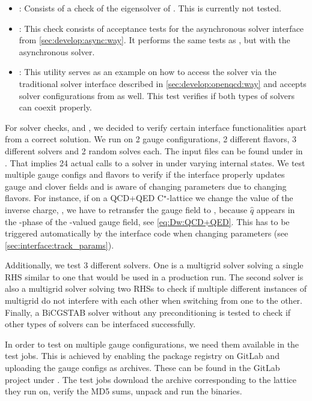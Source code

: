 \begin{itemize}
  \item {}: Consists of a check of the eigensolver of \quda. This is currently not tested.
  \item {}: This check consists of acceptance tests for the asynchronous solver interface from \cref{sec:develop:async:way}. It performs the same tests as , but with the asynchronous solver.
  \item {}: This utility serves as an example on how to access the \quda solver via the traditional solver interface described in \cref{sec:develop:openqcd:way} and accepts solver configurations from \openqxd as well. This test verifies if both types of solvers can coexit properly.
\end{itemize}

For solver checks,  and , we decided to verify certain interface functionalities apart from a correct solution.
We run on \num{2} gauge configurations, \num{2} different flavors, \num{3} different solvers and \num{2} random solves each.
The input files can be found under  in \cite{gitlab:openqxd-devel}.
That implies \num{24} actual calls to a solver in \quda under varying internal states.
We test multiple gauge configs and flavors to verify if the interface properly updates gauge and clover fields and is aware of changing parameters due to changing flavors.
For instance, if on a QCD+QED C$^{\star}$-lattice we change the value of the inverse charge, , we have to retransfer the gauge field to \quda, because $\hat{q}$ appears in the -phase of the -valued gauge field, see \cref{eq:Dw:QCD+QED}.
This has to be triggered automatically by the interface code when changing parameters (see \cref{sec:interface:track_params}).

Additionally, we test \num{3} different solvers.
One is a multigrid solver solving a single RHS similar to one that would be used in a production run.
The second solver is also a multigrid solver solving two RHSs to check if multiple different instances of multigrid do not interfere with each other when switching from one to the other.
Finally, a BiCGSTAB solver without any preconditioning is tested to check if other types of solvers can be interfaced successfully.

In order to test on multiple gauge configurations, we need them available in the test jobs.
This is achieved by enabling the package registry on GitLab and uploading the gauge configs as  archives.
These can be found in the GitLab project under .
The test jobs download the archive corresponding to the lattice they run on, verify the MD5 sums, unpack and run the binaries.

